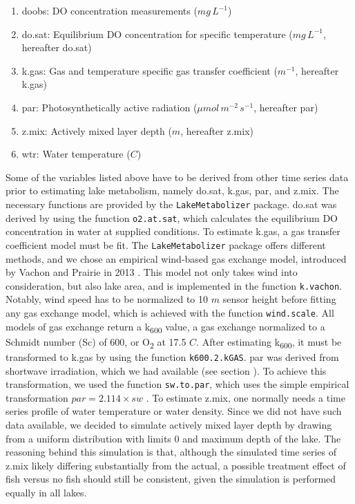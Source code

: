 \documentclass[11pt,lineno]{manuscript}\usepackage[]{graphicx}\usepackage[]{xcolor}
\begin{document}
\begin{enumerate}
\item doobs: DO concentration measurements ($mg\,L^{-1}$)
\item do.sat: Equilibrium DO concentration for specific temperature ($mg\,L^{-1}$, hereafter do.sat)
\item k.gas: Gas and temperature specific gas transfer coefficient ($m^{-1}$, hereafter k.gas)
\item par: Photosynthetically active radiation ($\mu{}mol\,m^{-2}\,s^{-1}$, hereafter par)
\item z.mix: Actively mixed layer depth ($m$, hereafter z.mix)
\item wtr: Water temperature (\textdegree{}$C$)
\end{enumerate}

Some of the variables listed above have to be derived from other time series data prior
to estimating lake metabolism,
namely do.sat, k.gas, par, and z.mix. The necessary functions are provided by the
\texttt{LakeMetabolizer} package.
do.sat was derived by using the function \texttt{o2.at.sat}, which calculates
the equilibrium DO concentration in water at supplied conditions.
To estimate k.gas, a gas transfer coefficient model must be fit.
The \texttt{LakeMetabolizer} package offers different methods, and we chose
an empirical wind-based gas exchange model, introduced by Vachon and
Prairie in 2013 \citep{Vachon:2013}. This model not only takes wind into
consideration, but also lake area, and is implemented in the function
\texttt{k.vachon}. Notably, wind speed has to be normalized
to 10 $m$ sensor height before fitting any gas exchange model, which is achieved
with the function \texttt{wind.scale}.
All models of gas exchange 
return a k\textsubscript{600} value, a gas exchange normalized to a Schmidt 
number (Sc) of 600, or O\textsubscript{2} at 17.5 \textdegree{}$C$.
After estimating k\textsubscript{600}, it must be transformed to k.gas by using the
function \texttt{k600.2.kGAS}. par was derived from shortwave irradiation,
which we had available (see section ).
To achieve this transformation, we used the function \texttt{sw.to.par},
which uses the simple empirical transformation $par = 2.114 \times sw$ \citep{Britton:1976}.
To estimate z.mix, one normally needs a time series profile of water temperature
or water density. Since we did not have such data available, we decided to
simulate actively mixed layer depth by drawing from a uniform distribution
with limits 0 and maximum depth of the lake. The reasoning behind this simulation
is that, although the simulated time series of z.mix likely differing substantially
from the actual, a possible treatment effect of fish versus no fish should still be
consistent, given the simulation is performed equally in all lakes.\smallskip
\end{document}
